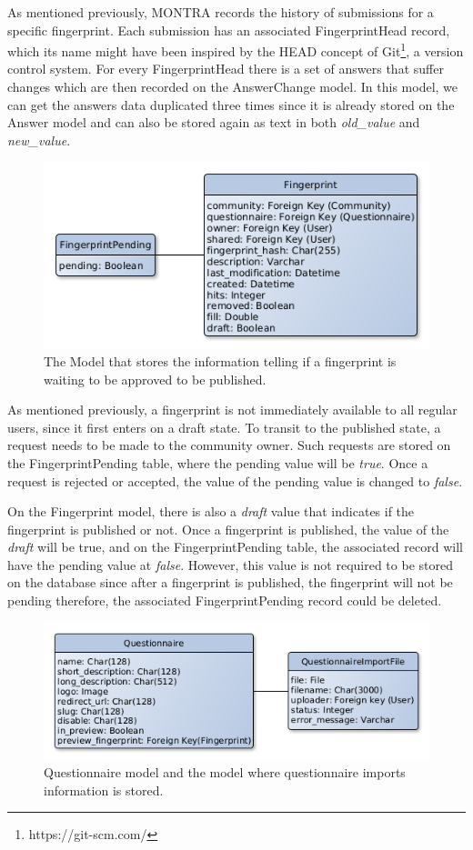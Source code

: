 As mentioned previously, MONTRA records the history of submissions for a specific fingerprint.
Each submission has an associated FingerprintHead record, which its name might have been inspired by the HEAD concept of Git\footnote{https://git-scm.com/}, a version control system.
For every FingerprintHead there is a set of answers that suffer changes which are then recorded on the AnswerChange model.
In this model, we can get the answers data duplicated three times since it is already stored on the Answer model and can also be stored again as text in both \textit{old\_value} and \textit{new\_value}.


\begin{figure}[H]
    \center
    \includegraphics[width=.6\linewidth]{fingerprint-pending-models}
    \caption{The Model that stores the information telling if a fingerprint is waiting to be approved to be published.}
    \label{fig:fingerprint-pending-model}
\end{figure}

As mentioned previously, a fingerprint is not immediately available to all regular users, since it first enters on a draft state.
To transit to the published state, a request needs to be made to the community owner.
Such requests are stored on the FingerprintPending table, where the pending value will be \textit{true}.
Once a request is rejected or accepted, the value of the pending value is changed to \textit{false}.

On the Fingerprint model, there is also a \textit{draft} value that indicates if the fingerprint is published or not.
Once a fingerprint is published, the value of the \textit{draft} will be true, and on the FingerprintPending table, the associated record will have the pending value at \textit{false}.
However, this value is not required to be stored on the database since after a fingerprint is published, the fingerprint will not be pending therefore, the associated FingerprintPending record could be deleted.


\begin{figure}[H]
    \center
    \includegraphics[width=.6\textwidth]{questionnaire-import-models}
    \caption{Questionnaire model and the model where questionnaire imports information is stored.}
    \label{fig:questionnaire-import-models}
\end{figure}

